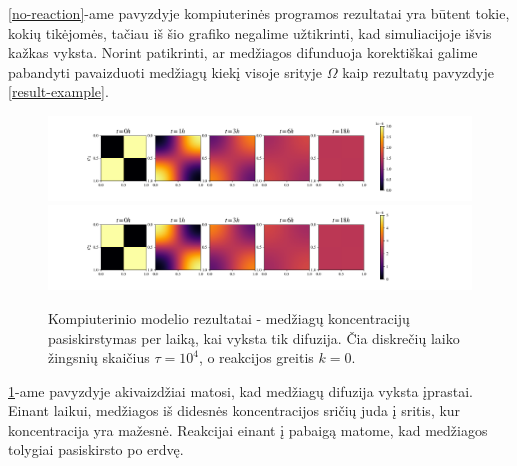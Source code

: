 \ref{no-reaction}-ame pavyzdyje kompiuterinės programos rezultatai yra būtent tokie, kokių tikėjomės, tačiau iš šio grafiko negalime užtikrinti, kad simuliacijoje išvis kažkas vyksta. Norint patikrinti, ar medžiagos difunduoja korektiškai galime pabandyti pavaizduoti medžiagų kiekį visoje srityje $\Omega$ kaip rezultatų pavyzdyje \eqref{result-example}.

\begin{figure}[h!]
\centering
\includegraphics[width=\textwidth]{../assets/all-only-diff-1.png} \\
\includegraphics[width=\textwidth]{../assets/all-only-diff-2.png}

\caption{Kompiuterinio modelio rezultatai - medžiagų koncentracijų pasiskirstymas per laiką, kai vyksta tik difuzija. Čia diskrečių laiko žingsnių skaičius $\tau=10^4$, o reakcijos greitis $k = 0$. }

\label{only-diffusion}
\end{figure}

\ref{only-diffusion}-ame pavyzdyje akivaizdžiai matosi, kad medžiagų difuzija vyksta įprastai. Einant laikui, medžiagos iš didesnės koncentracijos sričių juda į sritis, kur koncentracija yra mažesnė. Reakcijai einant į pabaigą matome, kad medžiagos tolygiai pasiskirsto po erdvę.


